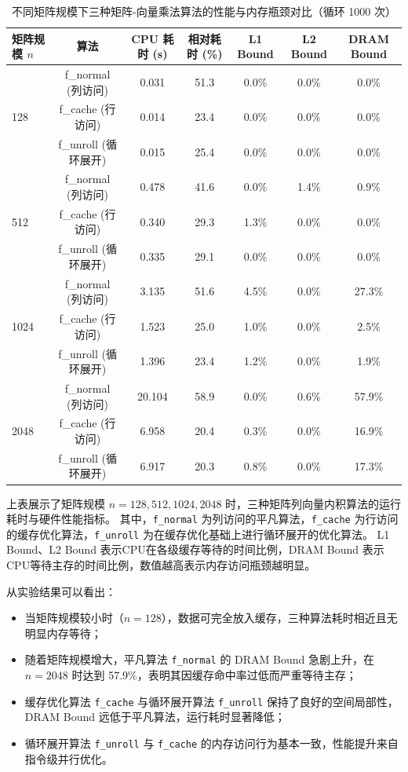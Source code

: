 \documentclass[a4paper]{article}
\begin{document}
\begin{table}[htbp]
  \centering
  \caption{不同矩阵规模下三种矩阵-向量乘法算法的性能与内存瓶颈对比（循环 1000 次）}
  \label{tab:cache_optimization_perf}
  \begin{tabular}{lcccccc}
    \toprule
    \textbf{矩阵规模} $n$ & \textbf{算法} & \textbf{CPU 耗时 (s)} & \textbf{相对耗时 (\%)} & \textbf{L1 Bound} & \textbf{L2 Bound} & \textbf{DRAM Bound} \\
    \midrule
    \multirow{3}{*}{128}
    & f\_normal (列访问) & 0.031 & 51.3 & 0.0\% & 0.0\% & 0.0\% \\
    & f\_cache (行访问) & 0.014 &23.4 & 0.0\% & 0.0\% & 0.0\% \\
    & f\_unroll (循环展开) & 0.015 & 25.4 & 0.0\% & 0.0\% & 0.0\% \\
    \midrule
    \multirow{3}{*}{512}
    & f\_normal (列访问) & 0.478 & 41.6 & 0.0\% & 1.4\% & 0.9\% \\
    & f\_cache (行访问) & 0.340 & 29.3 & 1.3\% & 0.0\% & 0.0\% \\
    & f\_unroll (循环展开) & 0.335 & 29.1 & 0.0\% & 0.0\% & 0.0\% \\
    \midrule
    \multirow{3}{*}{1024}
    & f\_normal (列访问) & 3.135 & 51.6 & 4.5\% & 0.0\% & 27.3\% \\
    & f\_cache (行访问) & 1.523 & 25.0 & 1.0\% & 0.0\% & 2.5\% \\
    & f\_unroll (循环展开) & 1.396 & 23.4 & 1.2\% & 0.0\% & 1.9\% \\
    \midrule
    \multirow{3}{*}{2048}
    & f\_normal (列访问) & 20.104 & 58.9 & 0.0\% & 0.6\% & 57.9\% \\
    & f\_cache (行访问) & 6.958 & 20.4 & 0.3\% & 0.0\% & 16.9\% \\
    & f\_unroll (循环展开) & 6.917 & 20.3 & 0.8\% & 0.0\% & 17.3\% \\
    \bottomrule
  \end{tabular}
\end{table}

上表展示了矩阵规模 $n=128, 512, 1024, 2048$ 时，三种矩阵列向量内积算法的运行耗时与硬件性能指标。
其中，\texttt{f\_normal} 为列访问的平凡算法，\texttt{f\_cache} 为行访问的缓存优化算法，\texttt{f\_unroll} 为在缓存优化基础上进行循环展开的优化算法。
L1 Bound、L2 Bound 表示CPU在各级缓存等待的时间比例，DRAM Bound 表示CPU等待主存的时间比例，数值越高表示内存访问瓶颈越明显。


从实验结果可以看出：
\begin{itemize}
  \item 当矩阵规模较小时（$n=128$），数据可完全放入缓存，三种算法耗时相近且无明显内存等待；
  \item 随着矩阵规模增大，平凡算法 \texttt{f\_normal} 的 DRAM Bound 急剧上升，在 $n=2048$ 时达到 57.9\%，表明其因缓存命中率过低而严重等待主存；
  \item 缓存优化算法 \texttt{f\_cache} 与循环展开算法 \texttt{f\_unroll} 保持了良好的空间局部性，DRAM Bound 远低于平凡算法，运行耗时显著降低；
  \item 循环展开算法 \texttt{f\_unroll} 与 \texttt{f\_cache} 的内存访问行为基本一致，性能提升来自指令级并行优化。
\end{itemize}
\end{document}
